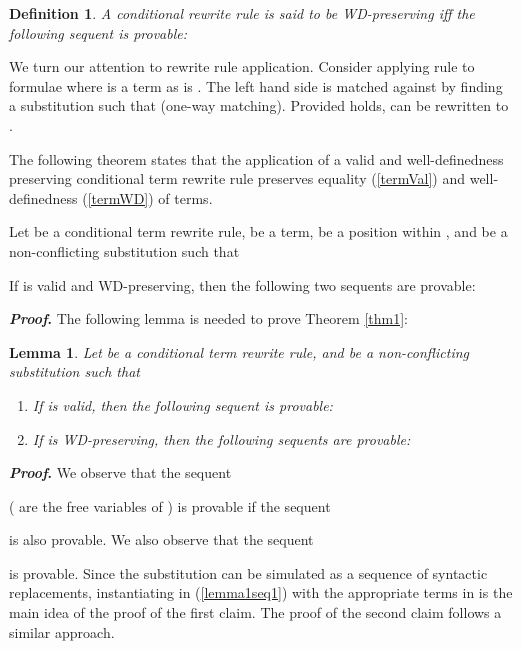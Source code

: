 \documentclass[copyright]{eptcs}
\newtheorem{lemma}[theorem]{Lemma}
\newtheorem{definition}[theorem]{Definition}
\begin{document}
\begin{definition}\label{wdRewPres}
A conditional rewrite rule  is said to be WD-preserving iff the following sequent is provable:

\end{definition}

We turn our attention to rewrite rule application. Consider applying rule  to formulae  where  is a term as is . The left hand side  is matched against  by finding a substitution  such that  (one-way matching). Provided  holds,   can be rewritten to . 
\par
The following theorem states that the application of a valid and well-definedness preserving conditional term rewrite rule preserves equality (\ref{termVal}) and well-definedness (\ref{termWD}) of terms.
\begin{theorem}\label{thm1}
Let  be a conditional term rewrite rule,  be a term,  be a position within , and  be a non-conflicting substitution such that

If  is valid and WD-preserving, then the following two sequents are provable:

\end{theorem}
\noindent \textbf{\textit{Proof}. } The following lemma is needed to prove Theorem \ref{thm1}:
\begin{lemma}\label{lemma1}
Let  be a conditional term rewrite rule, and  be a non-conflicting substitution such that

\begin{enumerate}
\item If  is valid, then the following sequent is provable:

\item If  is WD-preserving, then the following sequents are provable:

\end{enumerate}
\end{lemma}
\noindent \textbf{\textit{Proof}. }
We observe that the sequent

( are the free variables of ) is provable if the sequent

is also provable. We also observe that the sequent

is provable. Since the substitution  can be simulated as a sequence of syntactic replacements, instantiating  in (\ref{lemma1seq1}) with the appropriate terms in  is the main idea of the proof of the first claim. The proof of the second claim follows a similar approach.
\end{document}
